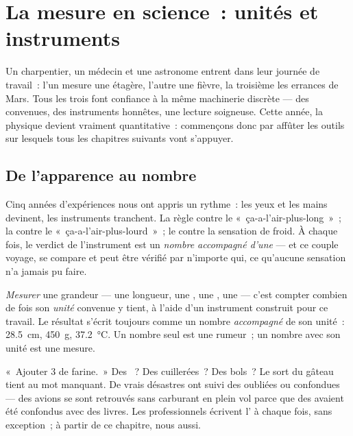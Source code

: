 \chapter{La mesure en science~: unités et instruments}\label{ch:g6:measurement-in-science}

Un charpentier, un médecin et une astronome entrent dans leur
journée de travail~: l'un mesure une étagère, l'autre une fièvre, la
troisième les errances de Mars. Tous les trois font confiance à la
même machinerie discrète --- des  convenues, des instruments
honnêtes, une lecture soigneuse. Cette année, la physique devient
vraiment quantitative~: commençons donc par affûter les outils sur
lesquels tous les chapitres suivants vont s'appuyer.

\section{De l'apparence au nombre}

Cinq années d'expériences nous ont appris un rythme~: les yeux et les
mains devinent, les instruments tranchent. La règle contre le
«~ça-a-l'air-plus-long~»~; la  contre le
«~ça-a-l'air-plus-lourd~»~; le  contre la sensation de
froid. À chaque fois, le verdict de l'instrument est un \emph{nombre
accompagné d'une } --- et ce couple voyage, se compare et peut
être vérifié par n'importe qui, ce qu'aucune sensation n'a jamais pu
faire.

\begin{definition}\label{def:g6:measurement-in-science:measuring}
\emph{Mesurer} une grandeur --- une longueur, une
, une , une  --- c'est compter combien de fois
son \emph{unité} convenue y tient, à l'aide d'un
instrument construit pour ce travail. Le résultat s'écrit toujours
comme un nombre \emph{accompagné} de son unité~: \qty{28.5}{cm},
\qty{450}{g}, \qty{37.2}{\celsius}. Un nombre seul est une rumeur~;
un nombre avec son unité est une mesure.
\end{definition}

\begin{example}\label{ex:g6:measurement-in-science:missing}
«~Ajouter 3 de farine.~» Des ~? Des cuillerées~? Des bols~? Le
sort du gâteau tient au mot manquant. De vrais désastres ont suivi
des  oubliées ou confondues --- des avions se sont retrouvés
sans carburant en plein vol parce que des  avaient été
confondus avec des livres. Les professionnels écrivent l' à
chaque fois, sans exception~; à partir de ce chapitre, nous aussi.
\end{example}

